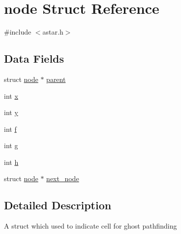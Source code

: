 \hypertarget{structnode}{\section{node Struct Reference}
\label{structnode}
}


{\ttfamily \#include $<$astar.\-h$>$}

\subsection*{Data Fields}
\begin{DoxyCompactItemize}
\item 
struct \hyperlink{structnode}{node} $\ast$ \hyperlink{structnode_a05e4fe9e0177ba2d8dbd2c487cfddd53}{parent}
\item 
int \hyperlink{structnode_a64dd8b65a7d38c632a017d7f36444dbb}{x}
\item 
int \hyperlink{structnode_ae944a3a75efb9856fa5c6f2221e2b49e}{y}
\item 
int \hyperlink{structnode_aab10a587ed6c08a63dbb0d7fd0fd97da}{f}
\item 
int \hyperlink{structnode_a9ef0925236bc4d4018d1443570e862c7}{g}
\item 
int \hyperlink{structnode_a850e8af553a6eb934ef47e3a05a3b28b}{h}
\item 
struct \hyperlink{structnode}{node} $\ast$ \hyperlink{structnode_a24c054564fa79112d4b878d2576d3b4f}{next\-\_\-node}
\end{DoxyCompactItemize}


\subsection{Detailed Description}
A struct which used to indicate cell for ghost pathfinding 

